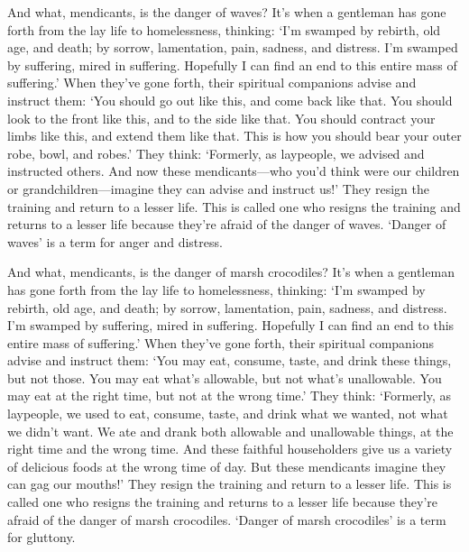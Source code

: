 \documentclass[12pt,openany]{book}%
\begin{document}
And what, mendicants, is the danger of waves? It’s when a gentleman has gone forth from the lay life to homelessness, thinking: ‘I’m swamped by rebirth, old age, and death; by sorrow, lamentation, pain, sadness, and distress. I’m swamped by suffering, mired in suffering. Hopefully I can find an end to this entire mass of suffering.’ When they’ve gone forth, their spiritual companions advise and instruct them: ‘You should go out like this, and come back like that. You should look to the front like this, and to the side like that. You should contract your limbs like this, and extend them like that. This is how you should bear your outer robe, bowl, and robes.’ They think: ‘Formerly, as laypeople, we advised and instructed others. And now these mendicants—who you’d think were our children or grandchildren—imagine they can advise and instruct us!’ They resign the training and return to a lesser life. This is called one who resigns the training and returns to a lesser life because they’re afraid of the danger of waves. ‘Danger of waves’ is a term for anger and distress. 

And what, mendicants, is the danger of marsh crocodiles? It’s when a gentleman has gone forth from the lay life to homelessness, thinking: ‘I’m swamped by rebirth, old age, and death; by sorrow, lamentation, pain, sadness, and distress. I’m swamped by suffering, mired in suffering. Hopefully I can find an end to this entire mass of suffering.’ When they’ve gone forth, their spiritual companions advise and instruct them: ‘You may eat, consume, taste, and drink these things, but not those. You may eat what’s allowable, but not what’s unallowable. You may eat at the right time, but not at the wrong time.’ They think: ‘Formerly, as laypeople, we used to eat, consume, taste, and drink what we wanted, not what we didn’t want. We ate and drank both allowable and unallowable things, at the right time and the wrong time. And these faithful householders give us a variety of delicious foods at the wrong time of day. But these mendicants imagine they can gag our mouths!’ They resign the training and return to a lesser life. This is called one who resigns the training and returns to a lesser life because they’re afraid of the danger of marsh crocodiles. ‘Danger of marsh crocodiles’ is a term for gluttony. 
\end{document}
